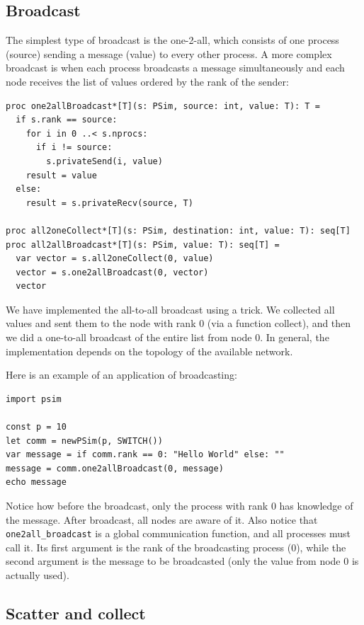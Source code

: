 \documentclass[justified, sixbynine]{tufte-book}
\def\ft{\small\tt}
\theoremstyle{plain}%
\newtheorem * {corollary}{Corollary}
\theoremstyle{definition}
\theoremstyle{remark}
\newtheorem * {remark}{Remark}
\newtheorem * {note}{Note}
\begin{document}
\begin{fullwidth}
\goodbreak\subsection{Broadcast}

The simplest type of broadcast is the one-2-all, which consists of one process (source) sending a message (value) to every other process. A more complex broadcast is when each process broadcasts a message simultaneously and each node receives the list of values ordered by the rank of the sender:

\begin{lstlisting}[caption={in file: {\ft psim.nim}}]
proc one2allBroadcast*[T](s: PSim, source: int, value: T): T =
  if s.rank == source:
    for i in 0 ..< s.nprocs:
      if i != source:
        s.privateSend(i, value)
    result = value
  else:
    result = s.privateRecv(source, T)

proc all2oneCollect*[T](s: PSim, destination: int, value: T): seq[T]
proc all2allBroadcast*[T](s: PSim, value: T): seq[T] =
  var vector = s.all2oneCollect(0, value)
  vector = s.one2allBroadcast(0, vector)
  vector
\end{lstlisting}

We have implemented the all-to-all broadcast using a trick. We collected all values and sent them to the node with rank 0 (via a function collect), and then we did a one-to-all broadcast of the entire list from node 0. In general, the implementation depends on the topology of the available network.

Here is an example of an application of broadcasting:

\begin{lstlisting}
import psim

const p = 10
let comm = newPSim(p, SWITCH())
var message = if comm.rank == 0: "Hello World" else: ""
message = comm.one2allBroadcast(0, message)
echo message
\end{lstlisting}

Notice how before the broadcast, only the process with rank 0 has knowledge of the message. After broadcast, all nodes are aware of it. Also notice that {\ft one2all\_broadcast} is a global communication function, and all processes must call it. Its first argument is the rank of the broadcasting process (0), while the second argument is the message to be broadcasted (only the value from node 0 is actually used).

\goodbreak\subsection{Scatter and collect}


\end{fullwidth}
\end{document}
